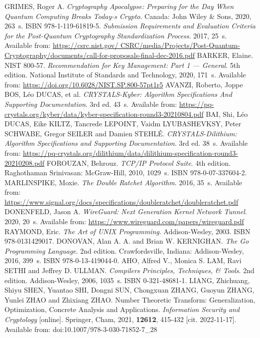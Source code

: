 \begin{thebibliography}{99}
  GRIMES, Roger A. \textit{Cryptography Apocalypse: Preparing for the Day When Quantum Computing Breaks Today-s Crypto}. Canada: John Wiley \& Sons, 2020, 263~s. ISBN 978-1-119-61819-5.
  \textit{Submission Requirements and Evaluation Criteria for the Post-Quantum Cryptography Standardization Process}. 2017, 25~s. Available from: \url{https://csrc.nist.gov/ CSRC/media/Projects/Post-Quantum-Cryptography/documents/call-for-proposals-final-dec-2016.pdf}
  BARKER, Elaine. NIST 800-57. \textit{Recommendation for Key Management: Part 1 --- General}. 5th edition. National Institute of Standards and Technology, 2020, 171~s. Available from: \url{https://doi.org/10.6028/NIST.SP.800-57pt1r5}
  AVANZI, Roberto, Joppe BOS, Léo DUCAS, et al. \textit{CRYSTALS-Kyber: Algorithm Specifications And Supporting Documentation}. 3rd ed. 43~s. Available from: \url{https://pq-crystals.org/kyber/data/kyber-specification-round3-20210804.pdf}
  BAI, Shi, Léo DUCAS, Eike KILTZ, Tancrede LEPOINT, Vaidm LYUBASHEVKSY, Peter SCHWABE, Gregor SEILER and Damien STEHLÉ. \textit{CRYSTALS-Dilithium: Algorithm Specifications and Supporting Documentation}. 3rd ed. 38~s. Available from: \url{https://pq-crystals.org/dilithium/data/dilithium-specification-round3-20210208.pdf}
  FOROUZAN, Behrouz. \textit{TCP/IP Protocol Suite}. 4th edition. Raghothaman Srinivasan: McGraw-Hill, 2010, 1029~s. ISBN 978-0-07-337604-2.
  MARLINSPIKE, Moxie. \textit{The Double Ratchet Algorithm}. 2016, 35~s. Available from: \url{https://www.signal.org/docs/specifications/doubleratchet/doubleratchet.pdf}
  DONENFELD, Jason A. \textit{WireGuard: Next Generation Kernel Network Tunnel}. 2020, 20~s. Available from: \url{https://www.wireguard.com/papers/wireguard.pdf}
  RAYMOND, Eric. \textit{The Art of UNIX Programming}. Addison-Wesley, 2003. ISBN 978-0131429017.
  DONOVAN, Alan A. A. and Brian W. KERNIGHAN. \textit{The Go Programming Language}. 2nd edition. Crawfordsville, Indiana: Addison-Wesley, 2016, 399~s. ISBN 978-0-13-419044-0.
  AHO, Alfred V., Monica S. LAM, Ravi SETHI and Jeffrey D. ULLMAN. \textit{Compilers Principles, Techniques, \& Tools}. 2nd edition. Addison-Wesley, 2006, 1035~s. ISBN 0-321-48681-1.
  LIANG, Zhichuang, Shiyu SHEN, Yuantao SHI, Dongni SUN, Chongxuan ZHANG, Guoyun ZHANG, Yunlei ZHAO and Zhixiang ZHAO. Number Theoretic Transform: Generalization, Optimization, Concrete Analysis and Applications. \textit{Information Security and Cryptology} [online]. Springer, Cham, 2021, \textbf{12612}, 415-432 [cit. 2022-11-17]. Available from: doi:10.1007/978-3-030-71852-7\_28

\end{thebibliography}

